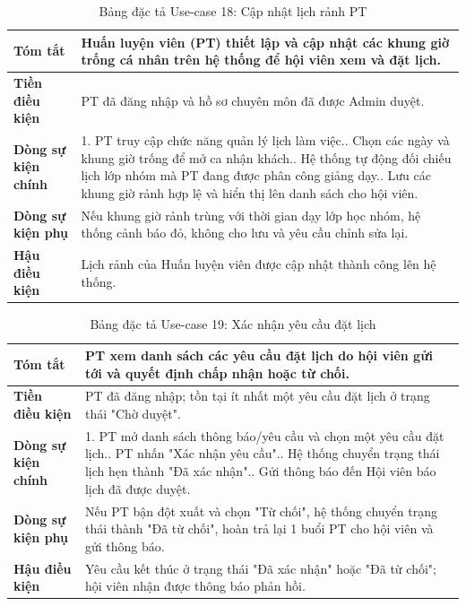 \documentclass[a4paper,12pt]{article}
\begin{document}
\begin{table}[H]\centering\footnotesize
\begin{tabularx}{\textwidth}{|L{3.2cm}|Y|}
\hline \textbf{Tóm tắt} & Huấn luyện viên (PT) thiết lập và cập nhật các khung giờ trống cá nhân trên hệ thống để hội viên xem và đặt lịch. \\ \hline
\textbf{Tiền điều kiện} & PT đã đăng nhập và hồ sơ chuyên môn đã được Admin duyệt. \\ \hline
\textbf{Dòng sự kiện chính} & 1. PT truy cập chức năng quản lý lịch làm việc.. Chọn các ngày và khung giờ trống để mở ca nhận khách.. Hệ thống tự động đối chiếu lịch lớp nhóm mà PT đang được phân công giảng dạy.. Lưu các khung giờ rảnh hợp lệ và hiển thị lên danh sách cho hội viên. \\ \hline
\textbf{Dòng sự kiện phụ} & Nếu khung giờ rảnh trùng với thời gian dạy lớp học nhóm, hệ thống cảnh báo đỏ, không cho lưu và yêu cầu chỉnh sửa lại. \\ \hline
\textbf{Hậu điều kiện} & Lịch rảnh của Huấn luyện viên được cập nhật thành công lên hệ thống. \\ \hline
\end{tabularx}
\caption{Bảng đặc tả Use-case 18: Cập nhật lịch rảnh PT}
\end{table}

\begin{table}[H]\centering\footnotesize
\begin{tabularx}{\textwidth}{|L{3.2cm}|Y|}
\hline \textbf{Tóm tắt} & PT xem danh sách các yêu cầu đặt lịch do hội viên gửi tới và quyết định chấp nhận hoặc từ chối. \\ \hline
\textbf{Tiền điều kiện} & PT đã đăng nhập; tồn tại ít nhất một yêu cầu đặt lịch ở trạng thái "Chờ duyệt". \\ \hline
\textbf{Dòng sự kiện chính} & 1. PT mở danh sách thông báo/yêu cầu và chọn một yêu cầu đặt lịch.. PT nhấn "Xác nhận yêu cầu".. Hệ thống chuyển trạng thái lịch hẹn thành "Đã xác nhận".. Gửi thông báo đến Hội viên báo lịch đã được duyệt. \\ \hline
\textbf{Dòng sự kiện phụ} & Nếu PT bận đột xuất và chọn "Từ chối", hệ thống chuyển trạng thái thành "Đã từ chối", hoàn trả lại 1 buổi PT cho hội viên và gửi thông báo. \\ \hline
\textbf{Hậu điều kiện} & Yêu cầu kết thúc ở trạng thái "Đã xác nhận" hoặc "Đã từ chối"; hội viên nhận được thông báo phản hồi. \\ \hline
\end{tabularx}
\caption{Bảng đặc tả Use-case 19: Xác nhận yêu cầu đặt lịch}
\end{table}
\end{document}
